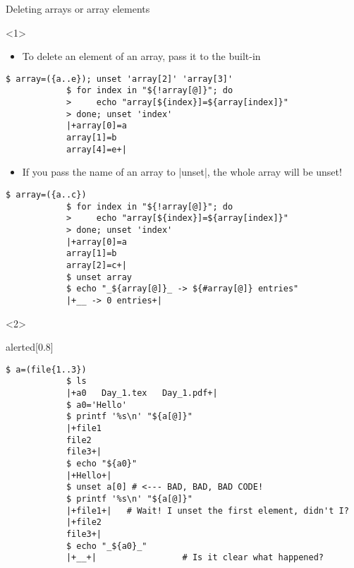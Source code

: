 \begin{frame}[fragile]{Deleting arrays or array elements}
    \vspace{-3mm}
    \begin{onlyenv}<1>
        \begin{itemize}
            \item To delete an element of an array, pass it to the  built-in
        \end{itemize}
        \begin{lstlisting}[style=MyBash, belowskip=-5mm]
            $ array=({a..e}); unset 'array[2]' 'array[3]'
            $ for index in "${!array[@]}"; do
            >     echo "array[${index}]=${array[index]}"
            > done; unset 'index'
            |+array[0]=a
            array[1]=b
            array[4]=e+|
        \end{lstlisting}
        \begin{itemize}
            \item If you pass the name of an array to \bash|unset|, the whole array will be unset!
        \end{itemize}
        \begin{lstlisting}[style=MyBash]
            $ array=({a..c})
            $ for index in "${!array[@]}"; do
            >     echo "array[${index}]=${array[index]}"
            > done; unset 'index'
            |+array[0]=a
            array[1]=b
            array[2]=c+|
            $ unset array
            $ echo "_${array[@]}_ -> ${#array[@]} entries"
            |+__ -> 0 entries+|
        \end{lstlisting}
    \end{onlyenv}
    \begin{onlyenv}<2>
        \begin{varblock}{alerted}[0.8\textwidth]{}
            \large {}
        \end{varblock}
        \begin{lstlisting}[style=MyBash, emph={[7]a, a0}]
            $ a=(file{1..3})
            $ ls
            |+a0   Day_1.tex   Day_1.pdf+|
            $ a0='Hello'
            $ printf '%s\n' "${a[@]}"
            |+file1
            file2
            file3+|
            $ echo "${a0}"
            |+Hello+|
            $ unset a[0] # <--- BAD, BAD, BAD CODE!
            $ printf '%s\n' "${a[@]}"
            |+file1+|   # Wait! I unset the first element, didn't I?
            |+file2
            file3+|
            $ echo "_${a0}_"
            |+__+|                 # Is it clear what happened?
        \end{lstlisting}
    \end{onlyenv}
\end{frame}
